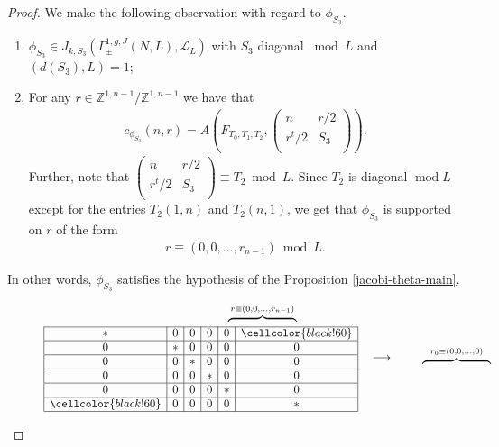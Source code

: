 \documentclass[11pt]{amsart}
\numberwithin{equation}{section}
\newcommand{\mbb}{\mathbb}
\newcommand{\mc}{\mathcal}
\newcommand{\smat}[4]{\left( \begin{smallmatrix} #1 & #2 \\ #3 & #4 \\ \end{smallmatrix} \right)}
\renewcommand*{\mod}{\operatorname{mod}}
\begin{document}
\begin{proof}
We make the following observation with regard to $\phi_{S_3}$.
\begin{enumerate}
    \item $\phi_{S_3}\in J_{k, S_3}(\Gamma_\pm^{1,g, J}(N, L), \mc L_L)$ with $S_3$ diagonal $\bmod L$ and $(d(S_3), L)=1$;
    \item For any $r\in \mbb Z^{1,n- 1}/\mbb Z^{1,n- 1}$ we have that
\begin{align}
    c_{\phi_{S_3}}(n, r)= A\left(F_{T_0,T_1,T_2}, \smat{n}{r/2}{r^t/2}{S_3} \right).
\end{align}
Further, note that $\smat{n}{r/2}{r^t/2}{S_3}\equiv T_2\bmod L$. Since $T_2$ is diagonal $\mod L$ except for the entries $T_2(1,n)$ and $T_2(n,1)$, we get that $\phi_{S_3}$ is supported on $r$ of the form 
\begin{align}
r\equiv (0,0,...,r_{n-1})\bmod L.  
\end{align}
\end{enumerate}
In other words, $\phi_{S_3}$ satisfies the hypothesis of the Proposition \ref{jacobi-theta-main}. 
\begin{figure}[!htbp]
\begin{align}
\begin{array}{@{}c@{}}
    \begin{array}{|c|c|c|c|c|c|}
    \multicolumn{1}{c}{} & \multicolumn{5}{c}{\overbrace{\hspace{6em}}^{ {r\equiv(0,0,\ldots,r_{n-1})  }}} \\ 
    \cline{1-6}
    * & 0 & 0 & 0 & 0 & \cellcolor{black!60} \\ \hline
    0 & * & 0 & 0 & 0 & 0 \\ \hline
    0 & 0 & * & 0 & 0 & 0 \\ \hline
    0 & 0 & 0 & * & 0 & 0 \\ \hline
    0 & 0 & 0 & 0 & * & 0 \\ \hline
    \cellcolor{black!60} & 0 & 0 & 0 & 0 & * \\ \hline
    \end{array}
\end{array}
\quad \longrightarrow \quad
\begin{array}{@{}c@{}}
    \begin{array}{|c|c|c|c|c|c|}
    \multicolumn{1}{c}{} & \multicolumn{5}{c}{\overbrace{\hspace{6em}}^{r_0\equiv(0,0,\ldots,0)  }} \\ 

\end{array}
\end{array}
\end{align}
\end{figure}
\end{proof}
\end{document}

